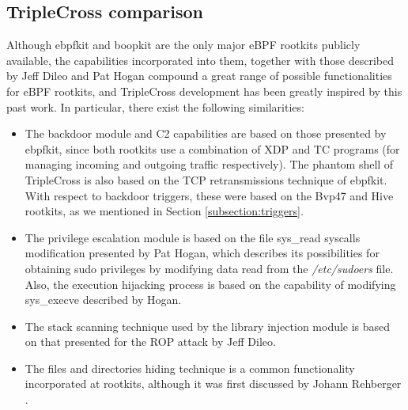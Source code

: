 \subsection{TripleCross comparison}
Although ebpfkit and boopkit are the only major eBPF rootkits publicly
available, the capabilities incorporated into them, together with those
described by Jeff Dileo and Pat Hogan compound a great range of possible
functionalities for eBPF rootkits, and TripleCross development has been
greatly inspired by this past work. In particular, there exist the
following similarities:
\begin{itemize}
\item The backdoor module and C2 capabilities are based on those presented by ebpfkit, since both rootkits use a combination of XDP and TC programs (for managing incoming and outgoing traffic respectively). The phantom shell of TripleCross is also based on the TCP retransmissions technique of ebpfkit. With respect to backdoor triggers, these were based on the Bvp47 and Hive rootkits, as we mentioned in Section \ref{subsection:triggers}.
\item The privilege escalation module is based on the file sys\_read syscalls modification presented by Pat Hogan, which describes its possibilities for obtaining sudo privileges by modifying data read from the \textit{/etc/sudoers} file. Also, the execution hijacking process is based on the capability of modifying sys\_execve described by Hogan.
\item The stack scanning technique used by the library injection module is based on that presented for the ROP attack by Jeff Dileo.
\item The files and directories hiding technique is a common functionality incorporated at rootkits, although it was first discussed by Johann Rehberger \cite{embracethered_getdents}.
\end{itemize}

